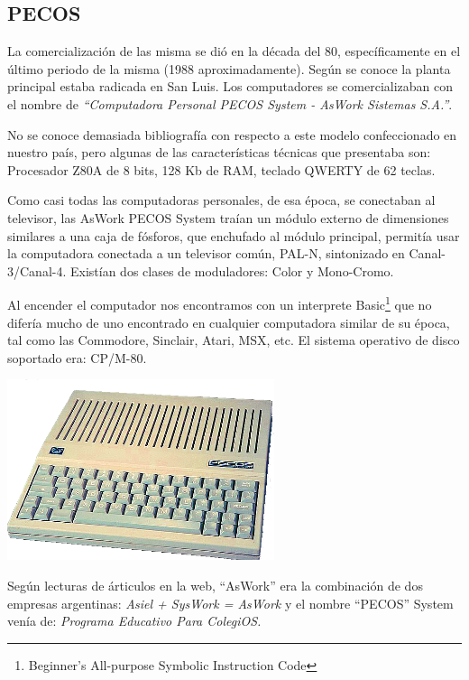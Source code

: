 \documentclass[%
  	final,
%
	notitlepage,
	narroweqnarray,
	inline,
 	twoside,
	]{ieee}
\begin{document}
\subsection*{PECOS}

La comercializaci\'on de las misma se di\'o en la d\'ecada del 80, espec\'ificamente en el \'ultimo periodo de la misma (1988 aproximadamente). Seg\'un se conoce la planta principal estaba radicada en San Luis. Los computadores se comercializaban con el nombre de \textit{``Computadora Personal PECOS System - AsWork Sistemas S.A.''}.

No se conoce demasiada bibliograf\'ia con respecto a este modelo confeccionado en nuestro pa\'is, pero algunas de las caracter\'isticas t\'ecnicas que presentaba son: Procesador Z80A de 8 bits, 128 Kb de RAM, teclado QWERTY de 62 teclas. 

Como casi todas las computadoras personales, de esa \'epoca, se conectaban al televisor, las AsWork PECOS System tra\'ian un m\'odulo externo de dimensiones similares a una caja de f\'osforos, que enchufado al m\'odulo principal, permit\'ia usar la computadora conectada a un televisor com\'un, PAL-N, sintonizado en Canal-3/Canal-4. Exist\'ian dos clases de moduladores: Color y Mono-Cromo. 

Al encender el computador nos encontramos con un interprete Basic\footnote{Beginner's All-purpose Symbolic Instruction Code} que no difer\'ia mucho de uno encontrado en cualquier computadora similar de su \'epoca, tal como las Commodore, Sinclair, Atari, MSX, etc. El sistema operativo de disco soportado era: CP/M-80.

\begin{center}\includegraphics[width=222pt, height=150pt]{pecos.png}\end{center}

Seg\'un lecturas de \'articulos en la web\cite{pecos}, ``AsWork'' era la combinaci\'on de dos empresas argentinas: \textit{Asiel + SysWork = AsWork} y el nombre ``PECOS'' System ven\'ia de: \textit{Programa Educativo Para ColegiOS.}
\end{document}
